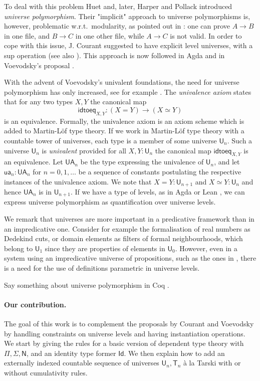 \documentclass[11pt,a4paper]{article}
\theoremstyle{definition}
\newcommand{\Id}{\mathsf{Id}}
\def\NN{\mathsf{N}}
\def\UU{\mathsf{U}}
\newcommand{\T}{\mathsf{T}}
\newcommand{\idtoeq}{\mathsf{idtoeq}}
\newcommand{\ua}{\mathsf{ua}}
\newcommand{\UA}{\mathsf{UA}}
\begin{document}
 To deal with this problem Huet \cite{Huet87} and, later,
 Harper and Pollack \cite{HarperP91} introduced {\em universe polymorphism}.
 Their "implicit" approach to universe polymorphisms is, however, problematic 
 w.r.t.\ modularity, as pointed out in \cite{Courant02,Simpson04}: 
 one can prove $A\rightarrow B$ in one file, and $B\rightarrow C$ in one other file, while
$A\rightarrow C$ is not valid. In order to cope with this issue, J. Courant \cite{Courant02}
suggested to have explicit level universes, with a sup operation (see also \cite{herbelin05}).
This approach is now followed in Agda and in Voevodsky's proposal \cite{VV}.

With the advent of Voevodsky's univalent foundations, the need for universe polymorphism 
has only increased, see for example \cite{VV}. 
The {\em univalence axiom} states that for any two types $X,Y$ the canonical map
$$
\idtoeq_{X,Y} : (X=Y)\to (X\simeq Y)
$$
is an equivalence.
Formally, the univalence axiom is an axiom scheme which is added to Martin-Löf type theory. 
If we work in Martin-Löf type theory with a countable tower of universes, 
each type is a member of some universe $\UU_n$. 
Such a universe $\UU_n$ is {\em univalent} provided for all $X,Y : \UU_n$ the 
canonical map $\idtoeq_{X,Y}$ is an equivalence. 
Let $\UA_n$ be the type expressing the univalence of $\UU_n$, and let
$\ua_n : \UA_n$ for $n = 0,1,\ldots$ be a sequence of constants postulating 
the respective instances of the univalence axiom. 
We note that $X = Y : \UU_{n+1}$ and $X\simeq Y : \UU_n$ and hence $\UA_n$ is in $\UU_{n+1}$.
If we have a type of levels, as in Agda \cite{agda-manual} or Lean \cite{moura:lean},
we can express universe polymorphism as quantification over universe levels.

We remark that universes are more important in a predicative framework 
than in an impredicative one.
Consider for example the formalisation of real numbers as Dedekind cuts, 
or domain elements as filters of formal neighbourhoods, 
which belong to $\UU_1$ since they are properties of elements in $\UU_0$.
However, even in a system using an impredicative universe of propositions,
such as the ones in \cite{Huet87,moura:lean}, there is a need for the use of 
definitions parametric in universe levels.

   \medskip
   
   Say something about universe polymorphism in Coq \cite{SozeauTabareau:coq}.

\paragraph{Our contribution.}
  The goal of this work is to complement the proposals by Courant \cite{Courant02}
  and Voevodsky \cite{VV} by handling constraints on universe levels 
  and having instantiation operations.
  We start by giving the rules for a basic version of dependent type theory with
  $\Pi, \Sigma, \NN$, and an identity type former $\Id$.
  We then explain how to add an externally indexed countable sequence of 
  universes $\UU_n, \T_n$ \`a la Tarski with or without cumulativity rules. 
  
\end{document}
